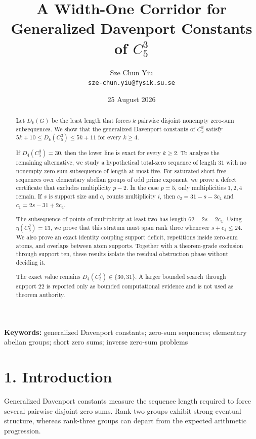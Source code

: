 \documentclass[
  11pt,
]{article}
\title{A Width-One Corridor for Generalized Davenport Constants of \(C_5^3\)}
\author{Sze Chun Yiu\\\texttt{sze-chun.yiu@fysik.su.se}}
\date{25 August 2026}
\begin{document}
\maketitle

\begin{abstract}
Let \(D_k(G)\) be the least length that forces \(k\) pairwise disjoint
nonempty zero-sum subsequences. We show that the generalized Davenport
constants of \(C_5^3\) satisfy \(5k+10\le D_k(C_5^3)\le5k+11\) for every
\(k\ge4\).

If \(D_4(C_5^3)=30\), then the lower line is exact for every \(k\ge2\).
To analyze the remaining alternative, we study a hypothetical total-zero
sequence of length \(31\) with no nonempty zero-sum subsequence of
length at most five. For saturated short-free sequences over elementary
abelian groups of odd prime exponent, we prove a defect certificate that
excludes multiplicity \(p-2\). In the case \(p=5\), only multiplicities
\(1,2,4\) remain. If \(s\) is support size and \(c_i\) counts
multiplicity \(i\), then \(c_2=31-s-3c_4\) and \(c_1=2s-31+2c_4\).

The subsequence of points of multiplicity at least two has length
\(62-2s-2c_4\). Using \(\eta(C_5^2)=13\), we prove that this stratum
must span rank three whenever \(s+c_4\le24\). We also prove an exact
identity coupling support deficit, repetitions inside zero-sum atoms,
and overlaps between atom supports. Together with a theorem-grade
exclusion through support ten, these results isolate the residual
obstruction phase without deciding it.

The exact value remains \(D_4(C_5^3)\in\{30,31\}\). A larger bounded
search through support 22 is reported only as bounded computational
evidence and is not used as theorem authority.

\end{abstract}

\noindent\textbf{Keywords:} generalized Davenport constants; zero-sum sequences;
elementary abelian groups; short zero sums; inverse zero-sum problems

\hypertarget{introduction}{%
\section{1. Introduction}\label{introduction}}

Generalized Davenport constants measure the sequence length required to
force several pairwise disjoint zero sums. Rank-two groups exhibit
strong eventual structure, whereas rank-three groups can depart from the
expected arithmetic progression.
\end{document}
